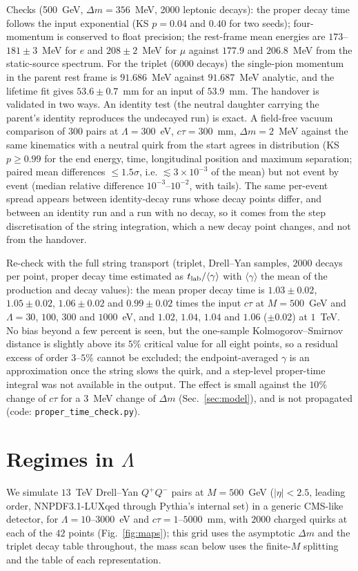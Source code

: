 \documentclass[prd,twocolumn,nofootinbib,superscriptaddress,amsmath,amssymb]{revtex4-2}
\begin{document}
Checks (500~GeV, $\Delta m=356$~MeV, 2000 leptonic decays): the proper decay time follows the input exponential (KS $p=0.04$ and $0.40$ for two seeds); four-momentum is conserved to float precision; the rest-frame mean energies are $173$--$181\pm3$~MeV for $e$ and $208\pm2$~MeV for $\mu$ against $177.9$ and $206.8$~MeV from the static-source spectrum. For the triplet (6000 decays) the single-pion momentum in the parent rest frame is $91.686$~MeV against $91.687$~MeV analytic, and the lifetime fit gives $53.6\pm0.7$~mm for an input of $53.9$~mm. The handover is validated in two ways. An identity test (the neutral daughter carrying the parent's identity reproduces the undecayed run) is exact. A field-free vacuum comparison of $300$ pairs at $\Lambda=300$~eV, $c\tau=300$~mm, $\Delta m=2$~MeV against the same kinematics with a neutral quirk from the start agrees in distribution (KS $p\ge0.99$ for the end energy, time, longitudinal position and maximum separation; paired mean differences $\le1.5\sigma$, i.e. $\lesssim3\times10^{-3}$ of the mean) but not event by event (median relative difference $10^{-3}$--$10^{-2}$, with tails). The same per-event spread appears between identity-decay runs whose decay points differ, and between an identity run and a run with no decay, so it comes from the step discretisation of the string integration, which a new decay point changes, and not from the handover.

Re-check with the full string transport (triplet, Drell--Yan samples, $2000$ decays per point, proper decay time estimated as $t_{\rm lab}/\langle\gamma\rangle$ with $\langle\gamma\rangle$ the mean of the production and decay values): the mean proper decay time is $1.03\pm0.02$, $1.05\pm0.02$, $1.06\pm0.02$ and $0.99\pm0.02$ times the input $c\tau$ at $M=500$~GeV and $\Lambda=30$, $100$, $300$ and $1000$~eV, and $1.02$, $1.04$, $1.04$ and $1.06$ ($\pm0.02$) at $1$~TeV. No bias beyond a few percent is seen, but the one-sample Kolmogorov--Smirnov distance is slightly above its $5\%$ critical value for all eight points, so a residual excess of order $3$--$5\%$ cannot be excluded; the endpoint-averaged $\gamma$ is an approximation once the string slows the quirk, and a step-level proper-time integral was not available in the output. The effect is small against the $10\%$ change of $c\tau$ for a $3$~MeV change of $\Delta m$ (Sec.~\ref{sec:model}), and is not propagated (code: \texttt{proper\_time\_check.py}).

\section{Regimes in $\Lambda$}\label{sec:regimes}
We simulate $13$~TeV Drell--Yan $Q^+Q^-$ pairs at $M=500$~GeV ($|\eta|<2.5$, leading order, NNPDF3.1-LUXqed through Pythia's internal set) in a generic CMS-like detector, for $\Lambda=10$--$3000$~eV and $c\tau=1$--$5000$~mm, with $2000$ charged quirks at each of the $42$ points (Fig.~\ref{fig:maps}); this grid uses the asymptotic $\Delta m$ and the triplet decay table throughout, the mass scan below uses the finite-$M$ splitting and the table of each representation.
\end{document}
